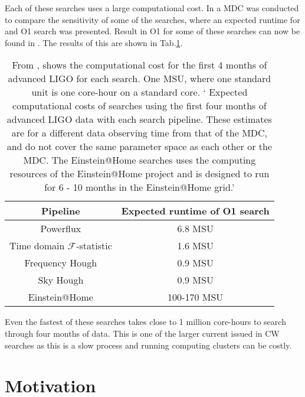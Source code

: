 Each of these searches uses a large computational cost. In \citep{walsh2016ComparisonMethods} a \gls{MDC} was conducted to compare the sensitivity of some of the searches, where an expected runtime for and O1 search was presented. Result in O1 for some of these searches can now be found in \citep{ligoscientificcollaborationandvirgocollaboration2017AllskySearch}.
The results of this are shown in Tab.\ref{searchcw:search:semi:cost}.
\begin{table}
	\centering
	\caption[Computational cost of \gls{CW} searches.]{From \citep{walsh2016ComparisonMethods}, shows the computational cost for the first 4 months of advanced \gls{LIGO} for each search. One \gls{MSU}, where one standard unit is one core-hour on a standard core. ` Expected computational costs of searches using the first four months of advanced \gls{LIGO} data with each search pipeline. These estimates are for a different data observing time from that of the \gls{MDC}, and do not cover the same parameter space as each other or the \gls{MDC}. The Einstein@Home searches uses the computing resources of the Einstein@Home project and is designed to run for 6 - 10 months in the Einstein@Home grid.'  \label{searchcw:search:semi:cost}}
	
	\bgroup
	\def\arraystretch{1.5}
	\centering
	\begin{tabular}{|c c|}
		\hline
		Pipeline & Expected runtime of O1 search \\
		\hline
		Powerflux & 6.8 MSU \\

		Time domain $\mathcal{F}$-statistic & 1.6 MSU\\

		Frequency Hough & 0.9 MSU \\

		Sky Hough & 0.9 MSU\\
		\hline
		Einstein@Home & 100-170 MSU\\
		\hline

	\end{tabular}
	\egroup
\end{table}
Even the fastest of these searches takes close to 1 million core-hours to search through four months of data.
This is one of the larger current issued in \gls{CW} searches as this is a slow process and running computing clusters can be costly.


\section{\label{searchcw:motivation}Motivation}

